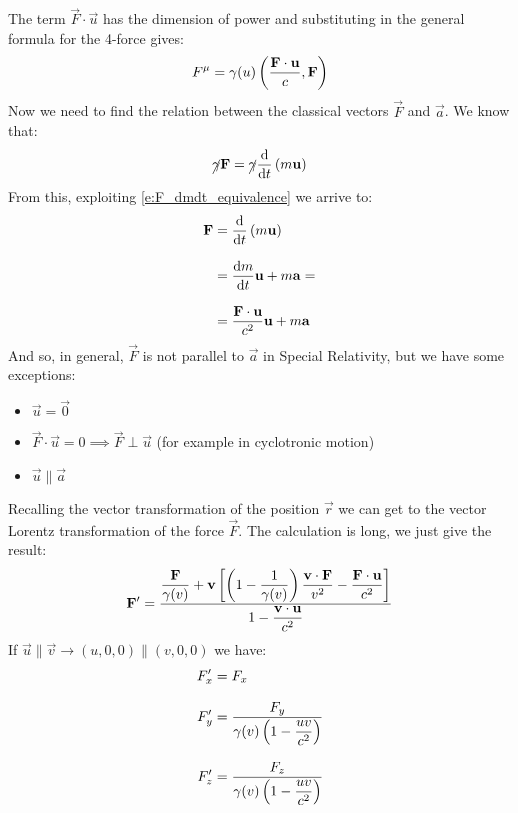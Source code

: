 The term $\vec{F}\cdot\vec{u}$ has the dimension of power and substituting in the general formula for the 4-force gives:
\begin{equation}
  F^{\mu} = \gamma (u) \left(\dfrac{\vb{F}\cdot\vb{u}}{c}, \vb{F}\right)
\end{equation}
Now we need to find the relation between the classical vectors $\vec{F}$ and $\vec{a}$. We know that:
\begin{equation}
  \cancel{\gamma} \vec{F} = \cancel{\gamma} \dv{}{t}\brackets{m\vec{u}}
\end{equation}
From this, exploiting \eqref{e:F_dmdt_equivalence} we arrive to:
\begin{equation}
  \begin{split}
    \vec{F} &= \dv{}{t}\brackets{m\vec{u}} \\[8pt]
    &= \dv{m}{t}\vec{u} + m\vec{a} = \\[8pt]
    &= \dfrac{\vec{F}\cdot\vec{u}}{c^2}\vec{u} + m\vec{a}
  \end{split}
\end{equation}
And so, in general, $\vec{F}$ is not parallel to $\vec{a}$ in Special Relativity, but we have some exceptions:
\begin{itemize}
  \item $\vec{u} = \vec{0}$
  \item $\vec{F}\cdot\vec{u} = 0 \implies \vec{F} \perp \vec{u}$ (for example in cyclotronic motion)
  \item $\vec{u} \parallel \vec{a}$
\end{itemize}
Recalling the vector transformation of the position $\vec{r}$ we can get to the vector Lorentz transformation of the force $\vec{F}$. The calculation is long, we just give the result:
\begin{equation}
  \vb{F}' = \dfrac{\dfrac{\vb{F}}{\gamma (v)} + \vb{v}\left[\left(1- \dfrac{1}{\gamma(v)}\right)\dfrac{\vb{v}\cdot \vb{F}}{v^2}-\dfrac{\vb{F}\cdot \vb{u}}{c^2}\right]}{1-\dfrac{\vb{v}\cdot\vb{u}}{c^2}}
\end{equation}
If $\vec{u} \parallel \vec{v} \rightarrow (u, 0, 0) \parallel (v, 0, 0)$ we have:
\begin{equation}
  \begin{split}
    F'_x &= F_x \\[8pt]
    F'_y &= \dfrac{F_y}{\gamma(v)\left(1-\dfrac{uv}{c^2}\right)}\\[8pt]
    F'_z &= \dfrac{F_z}{\gamma(v)\left(1-\dfrac{uv}{c^2}\right)}
  \end{split}
\end{equation}

